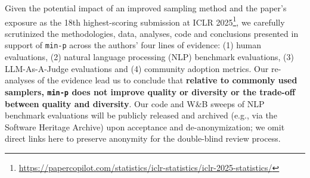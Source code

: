 Given the potential impact of an improved sampling method and the paper's exposure as the 18th highest-scoring submission at ICLR 2025\footnote{\url{https://papercopilot.com/statistics/iclr-statistics/iclr-2025-statistics/}}, we carefully scrutinized the methodologies, data, analyses, code and conclusions presented in support of \texttt{min-p} across the authors' four lines of evidence: (1) human evaluations, (2) natural language processing (NLP) benchmark evaluations, (3) LLM-As-A-Judge evaluations and (4) community adoption metrics.
Our re-analyses of the evidence lead us to conclude that \textbf{relative to commonly used samplers, \texttt{min-p} does not improve quality or diversity or the trade-off between quality and diversity}.
Our code and W\&B sweeps of NLP benchmark evaluations will be publicly released and archived (e.g., via the Software Heritage Archive) upon acceptance and de-anonymization; we omit direct links here to preserve anonymity for the double-blind review process.
